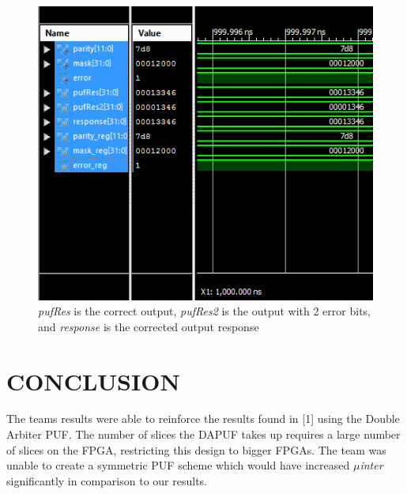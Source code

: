 \documentclass[letterpaper, 10 pt, conference]{ieeeconf}  %
\begin{document}
\begin{figure}[thpb]
	\centering
	\includegraphics[scale=.75]{bch}
   \caption{\emph{pufRes} is the correct output, \emph{pufRes2} is the output with 2 error bits, and \emph{response} is the corrected output response}
\end{figure}

\section{CONCLUSION}

The teams results were able to reinforce the results found in [1] using the Double Arbiter PUF. The number of slices the DAPUF takes up requires a large number of slices on the FPGA, restricting this design to bigger FPGAs. The team was unable to create a symmetric PUF scheme which would have increased \emph{$\mu$inter} significantly in comparison to our results.

\addtolength{\textheight}{-12cm}   %

\end{document}
